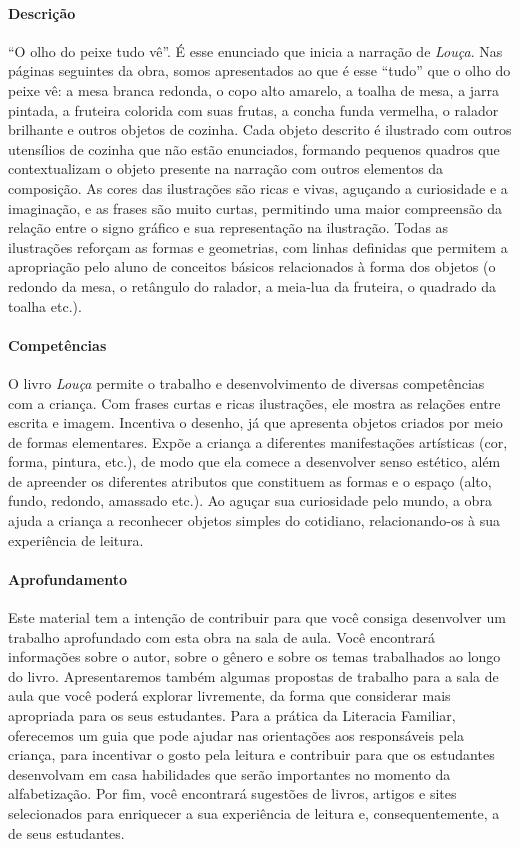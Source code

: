 \documentclass[11pt]{extarticle}
\begin{document}
\paragraph{Descrição} ``O olho do peixe tudo vê''. É esse enunciado que inicia a narração de \textit{Louça}. Nas páginas seguintes da obra, somos apresentados ao que é esse ``tudo'' que o olho do peixe vê: a mesa branca redonda, o copo alto amarelo, a toalha de mesa, a jarra pintada, a fruteira colorida com suas frutas, a concha funda vermelha, o ralador brilhante e outros objetos de cozinha. Cada objeto descrito é ilustrado com outros utensílios de cozinha que não estão enunciados, formando pequenos quadros que contextualizam o objeto presente na narração com outros elementos da composição. As cores das ilustrações são ricas e vivas, aguçando a curiosidade e a imaginação, e as frases são muito curtas, permitindo uma maior compreensão da relação entre o signo gráfico e sua representação na ilustração. Todas as ilustrações reforçam as formas e geometrias, com linhas definidas que permitem a apropriação pelo aluno de conceitos básicos relacionados à forma dos objetos (o redondo da mesa, o retângulo do ralador, a meia-lua da fruteira, o quadrado da toalha etc.).

\paragraph{Competências} O livro \textit{Louça} permite o trabalho e desenvolvimento de diversas competências com a criança. Com frases curtas e ricas ilustrações, ele mostra as relações entre escrita e imagem. Incentiva o desenho, já que apresenta objetos criados por meio de formas elementares. Expõe a criança a diferentes manifestações artísticas (cor, forma, pintura, etc.), de modo que ela comece a desenvolver senso estético, além de apreender os diferentes atributos que constituem as formas e o espaço (alto, fundo, redondo, amassado etc.). Ao aguçar sua curiosidade pelo mundo, a obra ajuda a criança a reconhecer objetos simples do cotidiano, relacionando-os à sua experiência de leitura.

\paragraph{Aprofundamento} Este material tem a 
intenção de contribuir para que você consiga desenvolver um trabalho aprofundado 
com esta obra na sala de aula. Você encontrará informações sobre o autor, sobre 
o gênero e sobre os temas trabalhados ao longo do livro. Apresentaremos também 
algumas propostas de trabalho para a sala de aula que você poderá explorar livremente, 
da forma que considerar mais apropriada para os seus estudantes. Para a prática 
da Literacia Familiar, oferecemos um guia que pode ajudar nas orientações aos 
responsáveis pela criança, para incentivar o gosto pela leitura e contribuir para 
que os estudantes desenvolvam em casa habilidades que serão importantes no momento 
da alfabetização. Por fim, você encontrará sugestões de livros, artigos e sites 
selecionados para enriquecer a sua experiência de leitura e, 
consequentemente, a de seus estudantes.
\end{document}
